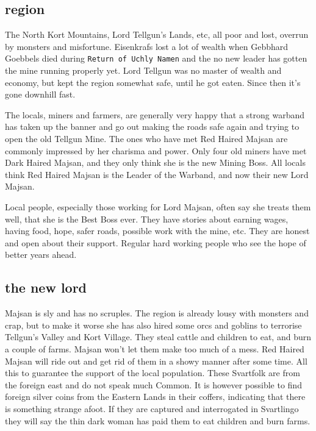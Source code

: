 \subsection*{region}
The North Kort Mountains, Lord Tellgun's Lands, etc, all poor and lost, overrun by monsters and misfortune. Eisenkrafs lost a lot of wealth when Gebbhard Goebbels died during \texttt{Return of Uchly Namen} and the no new leader has gotten the mine running properly yet. Lord Tellgun was no master of wealth and economy, but kept the region somewhat safe, until he got eaten. Since then it's gone downhill fast.

The locals, miners and farmers, are generally very happy that a strong warband has taken up the banner and go out making the roads safe again and trying to open the old Tellgun Mine. The ones who have met Red Haired Majsan are commonly impressed by her charisma and power. Only four old miners have met Dark Haired Majsan, and they only think she is the new Mining Boss. All locals think Red Haired Majsan is the Leader of the Warband, and now their new Lord Majsan.

Local people, especially those working for Lord Majsan, often say she treats them well, that she is the Best Boss ever. They have stories about earning wages, having food, hope, safer roads, possible work with the mine, etc. They are honest and open about their support. Regular hard working people who see the hope of better years ahead.


\subsection*{the new lord}
Majsan is sly and has no scruples. The region is already lousy with monsters and crap, but to make it worse she has also hired some orcs and goblins to terrorise Tellgun's Valley and Kort Village. They steal cattle and children to eat, and burn a couple of farms. Majsan won't let them make too much of a mess. Red Haired Majsan will ride out and get rid of them in a showy manner after some time. All this to guarantee the support of the local population. These Svartfolk are from the foreign east and do not speak much Common. It is however possible to find foreign silver coins from the Eastern Lands in their coffers, indicating that there is something strange afoot. If they are captured and interrogated in Svartlingo they will say the thin dark woman has paid them to eat children and burn farms.

